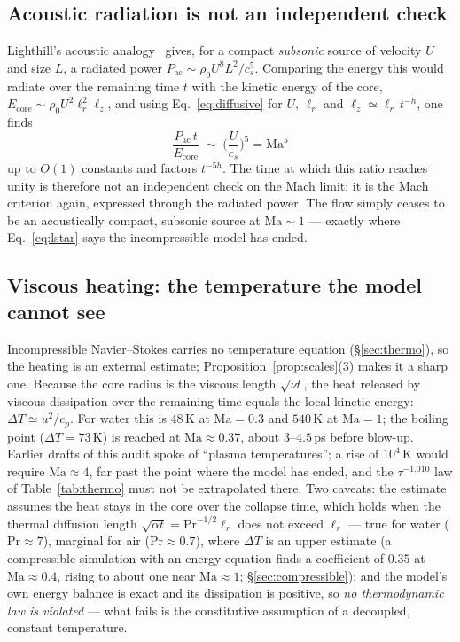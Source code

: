 \documentclass[11pt,a4paper]{article}
\begin{document}
\subsection{Acoustic radiation is not an independent check}

Lighthill's acoustic analogy~\cite{Lighthill1952,Proudman1952} gives, for a compact
\emph{subsonic} source of velocity $U$ and size $L$, a radiated power
$P_{\text{ac}}\sim\rho_0U^8L^2/c_s^5$. Comparing the energy this would radiate over the remaining
time $t$ with the kinetic energy of the core, $E_{\text{core}}\sim\rho_0U^2\ell_r^2\ell_z$, and
using Eq.~\eqref{eq:diffusive} for $U$, $\ell_r$ and $\ell_z\simeq\ell_r\,t^{-h}$, one finds
\begin{equation}
  \frac{P_{\text{ac}}\,t}{E_{\text{core}}}\;\sim\;\Big(\frac{U}{c_s}\Big)^{5}=\mathrm{Ma}^5
\end{equation}
up to $O(1)$ constants and factors $t^{-5h}$. The time at which this ratio reaches unity is
therefore not an independent check on the Mach limit: it is the Mach criterion again, expressed
through the radiated power. The flow simply ceases to be an acoustically compact, subsonic source at
$\mathrm{Ma}\sim1$ --- exactly where Eq.~\eqref{eq:lstar} says the incompressible model has ended.

\subsection{Viscous heating: the temperature the model cannot see}

Incompressible Navier--Stokes carries no temperature equation (\S\ref{sec:thermo}), so the heating
is an external estimate; Proposition~\ref{prop:scales}(3) makes it a sharp one. Because the core
radius is the viscous length $\sqrt{\nu t}$, the heat released by viscous dissipation over the
remaining time equals the local kinetic energy: $\Delta T\simeq u^2/c_p$. For water this is $48$\,K
at $\mathrm{Ma}=0.3$ and $540$\,K at $\mathrm{Ma}=1$; the boiling point ($\Delta T=73$\,K) is
reached at $\mathrm{Ma}\approx0.37$, about $3$--$4.5$\,ps before blow-up. Earlier drafts of this
audit spoke of ``plasma temperatures''; a rise of $10^4$\,K would require $\mathrm{Ma}\approx4$, far
past the point where the model has ended, and the $\tau^{-1.010}$ law of Table~\ref{tab:thermo}
must not be extrapolated there. Two caveats: the estimate assumes the heat stays in the core over
the collapse time, which holds when the thermal diffusion length $\sqrt{\alpha t}=\mathrm{Pr}^{-1/2}\ell_r$
does not exceed $\ell_r$ --- true for water ($\mathrm{Pr}\approx7$), marginal for air
($\mathrm{Pr}\approx0.7$), where $\Delta T$ is an upper estimate (a compressible simulation with an
energy equation finds a coefficient of $0.35$ at $\mathrm{Ma}\approx0.4$, rising to about one near
$\mathrm{Ma}\approx1$; \S\ref{sec:compressible}); and the model's own energy balance
is exact and its dissipation is positive, so \emph{no thermodynamic law is violated} --- what fails
is the constitutive assumption of a decoupled, constant temperature.
\end{document}
